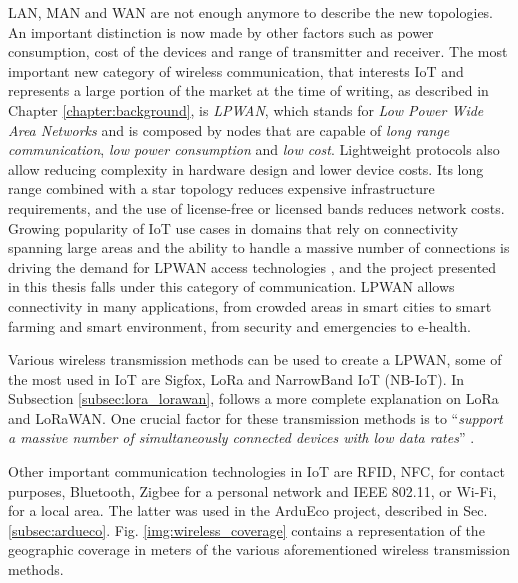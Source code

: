 		LAN, MAN and WAN are not enough anymore to describe the new topologies.
		An important distinction is now made by other factors such as power consumption, cost of the devices and range of transmitter and receiver.	
		The most important new category of wireless communication, that interests IoT and represents a large portion of the market at the time of writing, as described in Chapter \ref{chapter:background}, is \textit{LPWAN}, which stands for \textit{Low Power Wide Area Networks} and is composed by nodes that are capable of \textit{long range communication}, \textit{low power consumption} and \textit{low cost}.
		Lightweight protocols also allow reducing complexity in hardware design and lower device costs.
		Its long range combined with a star topology reduces expensive infrastructure requirements, and the use of license-free or licensed bands reduces network costs.
		Growing popularity of IoT use cases in domains that rely on connectivity spanning large areas and the ability to handle a massive number of connections is driving the demand for LPWAN access technologies \cite{fi12030046}, and the project presented in this thesis falls under this category of communication.
		LPWAN allows connectivity in many applications, from crowded areas in smart cities to smart farming and smart environment, from security and emergencies to e-health.
		
		Various wireless transmission methods can be used to create a LPWAN, some of the most used in IoT are Sigfox, LoRa and NarrowBand IoT (NB-IoT).
		In Subsection \ref{subsec:lora_lorawan}, follows a more complete explanation on LoRa and LoRaWAN.
		One crucial factor for these transmission methods is to ``\textit{support a massive number of simultaneously connected devices with low data rates}'' \cite{fi12030046}.
		
		Other important communication technologies in IoT are RFID, NFC, for contact purposes, Bluetooth, Zigbee for a personal network and IEEE 802.11, or Wi-Fi, for a local area.
		The latter was used in the ArduEco project, described in Sec. \ref{subsec:ardueco}.
		Fig. \ref{img:wireless_coverage} contains a representation of the geographic coverage in meters of the various aforementioned wireless transmission methods.
	
